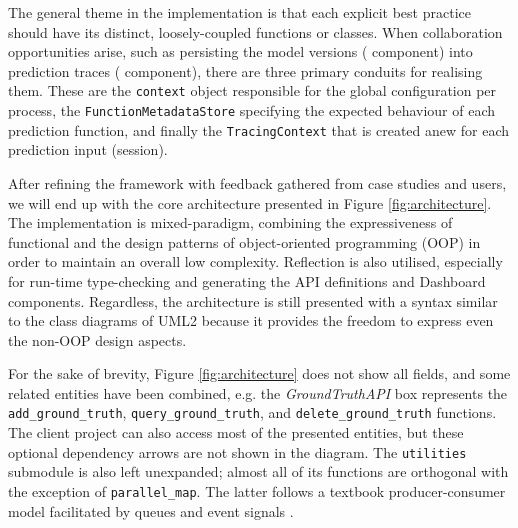The general theme in the implementation is that each explicit best practice should have its distinct, loosely-coupled functions or classes. When collaboration opportunities arise, such as persisting the model versions ( component) into prediction traces ( component), there are three primary conduits for realising them. These are the \texttt{context} object responsible for the global configuration per process, the \texttt{FunctionMetadataStore} specifying the expected behaviour of each prediction function, and finally the \texttt{TracingContext} that is created anew for each prediction input (session).

After refining the framework with feedback gathered from case studies and users, we will end up with the core architecture presented in Figure \ref{fig:architecture}. The implementation is mixed-paradigm, combining the expressiveness of functional and the design patterns of object-oriented programming (OOP) in order to maintain an overall low complexity. Reflection is also utilised, especially for run-time type-checking and generating the API definitions and Dashboard components. Regardless, the architecture is still presented with a syntax similar to the class diagrams of UML2 \cite{Rumbaugh2004} because it provides the freedom to express even the non-OOP design aspects.

For the sake of brevity, Figure \ref{fig:architecture} does not show all fields, and some related entities have been combined, e.g. the \textit{GroundTruthAPI} box represents the \texttt{add\_ground\_truth}, \texttt{query\_ground\_truth}, and \texttt{delete\_ground\_truth} functions. The client project can also access most of the presented entities, but these optional dependency arrows are not shown in the diagram. The \texttt{utilities} submodule is also left unexpanded; almost all of its functions are orthogonal with the exception of \texttt{parallel\_map}. The latter follows a textbook producer-consumer model facilitated by queues and event signals \cite{wang2020producer}.

